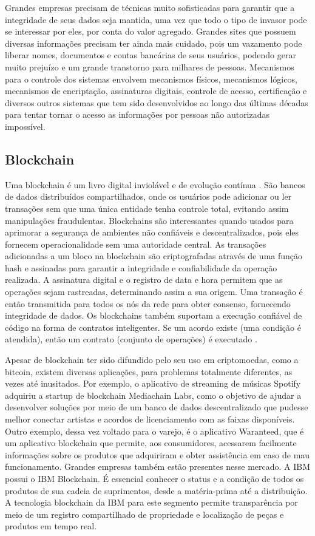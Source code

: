 Grandes empresas precisam de técnicas muito sofisticadas para garantir que a integridade de seus dados seja mantida, uma vez que todo o tipo de invasor pode se interessar por eles, por conta do valor agregado. Grandes sites que possuem diversas informações precisam ter  ainda mais cuidado, pois um vazamento pode liberar nomes, documentos e contas bancárias de seus usuários, podendo gerar muito prejuízo e um grande transtorno para milhares de pessoas. Mecanismos para o controle dos sistemas envolvem mecanismos físicos, mecanismos lógicos, mecanismos de encriptação, assinaturas digitais, controle de acesso, certificação e diversos outros sistemas que tem sido desenvolvidos ao longo das últimas décadas para tentar tornar o acesso as informações por pessoas não autorizadas impossível. 

\subsection{Blockchain}
	Uma blockchain é um livro digital inviolável e de evolução contínua \cite{manzoor2018blockchain}.
	São bancos de dados distribuídos compartilhados, onde os usuários
    pode adicionar ou ler transações sem que uma única entidade tenha controle total, evitando assim manipulações fraudulentas. Blockchains são interessantes quando usados para aprimorar a segurança de ambientes não confiáveis e descentralizados, pois eles fornecem operacionalidade sem uma autoridade central. As transações adicionadas a um bloco na blockchain são criptografadas através de uma função hash e assinadas para garantir a integridade e confiabilidade da operação realizada. A assinatura digital e o registro de data e hora permitem que as operações sejam rastreadas, determinando assim a sua origem. Uma transação é então transmitida para todos os nós da rede para obter consenso, fornecendo integridade de dados. Os blockchains também suportam a execução confiável de código na forma de contratos inteligentes. Se um acordo existe (uma condição é atendida), então um contrato (conjunto de operações) é executado \cite{taylor2019systematic}.
    
    Apesar de blockchain ter sido difundido pelo seu uso em criptomoedas, como a bitcoin, existem diversas aplicações, para problemas totalmente diferentes, as vezes até inusitados. Por exemplo, o aplicativo de streaming de músicas Spotify adquiriu a startup de blockchain Mediachain Labs, como o objetivo de ajudar a desenvolver soluções por meio de um banco de dados descentralizado que pudesse melhor conectar artistas e acordos de licenciamento com as faixas disponíveis. Outro exemplo, dessa vez voltado para o varejo, é o aplicativo Waranteed, que é um aplicativo blockchain que permite, aos consumidores, acessarem facilmente informações sobre os produtos que adquiriram e obter assistência em caso de mau funcionamento. Grandes empresas também estão presentes nesse mercado. A IBM possui o IBM Blockchain. É essencial conhecer o status e a condição de todos os produtos de sua cadeia de suprimentos, desde a matéria-prima até a distribuição. A tecnologia blockchain da IBM para este segmento permite transparência por meio de um registro compartilhado de propriedade e localização de peças e produtos em tempo real.